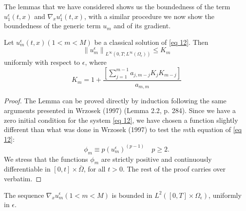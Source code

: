 The lemmas that we have considered shows us the boundedness of the term $u_1^{\epsilon}(t,x)$ and $\nabla_{x} u_{1}^{\epsilon}(t, x)$, with a similar procedure we now show the boundedness of the generic term $u_m$ and of its gradient.
\begin{lemma} Let $u_{m}^{\epsilon}(t, x)(1<m<M)$ be a classical solution of \eqref{eq 12}. Then
\begin{equation}
  \left\|u_{m}^{\epsilon}\right\|_{L^{\infty}\left(0, T ; L^{\infty}\left(\Omega_{\epsilon}\right)\right)} \leq K_{m}
\label{eq 62}\end{equation}
uniformly with respect to $\epsilon$, where
\begin{equation}
  K_{m}=1+\frac{\left[\sum_{j=1}^{m-1} a_{j, m-j} K_{j} K_{m-j}\right]}{a_{m, m}}
\label{eq 63}\end{equation}
\label{lemma 5.5}\end{lemma}
\begin{proof}
The Lemma can be proved directly by induction following the same arguments presented in Wrzosek (1997) (Lemma 2.2, p. 284). Since we have a zero initial condition for the system \eqref{eq 12}, we have chosen a function slightly different than what was done in Wrzosek (1997) to test the $m$th equation of \eqref{eq 12}:
$$
\phi_{m} \equiv p\left(u_{m}^{\epsilon}\right)^{(p-1)} \quad p \geq 2 .
$$
We stress that the functions $\phi_{m}$ are strictly positive and continuously differentiable in $[0, t] \times \bar{\Omega}$, for all $t>0$. The rest of the proof carries over verbatim.
\end{proof} 
\begin{lemma}
The sequence $\nabla_{x} u_{m}^{\epsilon}(1<m<M)$ is bounded in $L^{2}\left([0, T] \times \Omega_{\epsilon}\right)$, uniformly in $\epsilon$.
\label{lemma 5.6}\end{lemma}
